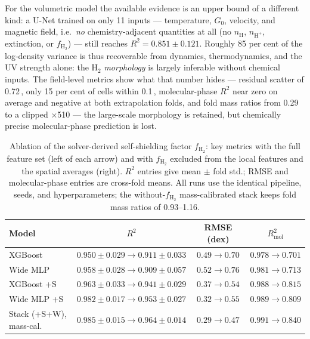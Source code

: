 \documentclass[fleqn,usenatbib]{rasti}
\newcommand{\Gzero}{G_0}
\newcommand{\fshield}{f_{\mathrm{H_2}}}
\newcommand{\dex}{\,\text{dex}}
\newcommand{\Rsq}{R^2}
\begin{document}
For the volumetric model the available evidence is an upper bound of a
different kind: a U-Net trained on only 11 inputs --- temperature,
\(\Gzero\), velocity, and magnetic field, i.e.\ \emph{no}
chemistry-adjacent quantities at all (no \(n_{\mathrm{H}}\),
\(n_{\mathrm{H^+}}\), extinction, or \(\fshield\)) --- still reaches
\(\Rsq = 0.851 \pm 0.121\). Roughly 85 per cent of the log-density
variance is thus recoverable from dynamics, thermodynamics, and the UV
strength alone: the H\(_2\) \emph{morphology} is largely inferable without
chemical inputs. The field-level metrics show what that number hides ---
residual scatter of 0.72\dex, only 15 per cent of cells within
0.1\dex, molecular-phase \(\Rsq\) near zero on average and negative at
both extrapolation folds, and fold mass ratios from 0.29 to a clipped
\(\times\)510 --- the large-scale morphology is retained, but chemically
precise molecular-phase prediction is lost.

\begin{table}
\centering
\caption{Ablation of the solver-derived self-shielding factor
\(\fshield\): key metrics with the full feature set (left of each arrow)
and with \(\fshield\) excluded from the local features and the spatial
averages (right). \(\Rsq\) entries give mean \(\pm\) fold std.; RMSE and
molecular-phase entries are cross-fold means. All runs use the identical
pipeline, seeds, and hyperparameters; the without-\(\fshield\)
mass-calibrated stack keeps fold mass ratios of 0.93--1.16.}
\label{tab:fh2}
\begin{tabular}{lccc}
\hline
Model & \(\Rsq\) & RMSE (dex) & \(\Rsq_{\mathrm{mol}}\) \\
\hline
XGBoost              & \(0.950 \pm 0.029 \rightarrow 0.911 \pm 0.033\) & \(0.49 \rightarrow 0.70\) & \(0.978 \rightarrow 0.701\) \\
Wide MLP             & \(0.958 \pm 0.028 \rightarrow 0.909 \pm 0.057\) & \(0.52 \rightarrow 0.76\) & \(0.981 \rightarrow 0.713\) \\
XGBoost +S           & \(0.963 \pm 0.033 \rightarrow 0.941 \pm 0.029\) & \(0.37 \rightarrow 0.54\) & \(0.988 \rightarrow 0.815\) \\
Wide MLP +S          & \(0.982 \pm 0.017 \rightarrow 0.953 \pm 0.027\) & \(0.32 \rightarrow 0.55\) & \(0.989 \rightarrow 0.809\) \\
Stack (+S+W), mass-cal. & \(0.985 \pm 0.015 \rightarrow 0.964 \pm 0.014\) & \(0.29 \rightarrow 0.47\) & \(0.991 \rightarrow 0.840\) \\
\hline
\end{tabular}
\end{table}
\end{document}
